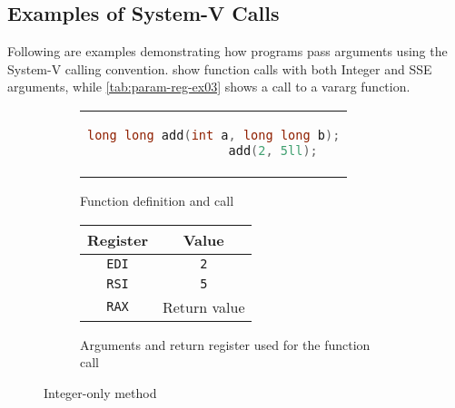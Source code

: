 \subsection{Examples of System-V Calls}\label{subsec:examples}

Following are examples demonstrating how programs pass arguments using the System-V calling convention.
 show function calls with both Integer and SSE arguments, while \cref{tab:param-reg-ex03} shows a call to a vararg function.

\begin{figure}[htpb]
    \centering
    \begin{subfigure}{.65\textwidth}
        \centering
        \begin{tabular}{c}
            \begin{lstlisting}[language=C]
                long long add(int a, long long b);
                add(2, 5ll);
            \end{lstlisting}
        \end{tabular}
        \caption{Function definition and call}
    \end{subfigure}
    \begin{subfigure}{.3\textwidth}
        \centering
        \begin{tabular}{|c|c|}
            \hline
            Register     & Value        \\
            \hline
            \texttt{EDI} & \texttt{2}   \\
            \texttt{RSI} & \texttt{5}   \\
            \hline
            \texttt{RAX} & Return value \\
            \hline
        \end{tabular}
        \caption{Arguments and return register used for the function call}
    \end{subfigure}
    \caption{Integer-only method}
    \label{tab:param-reg-ex01}
\end{figure}


